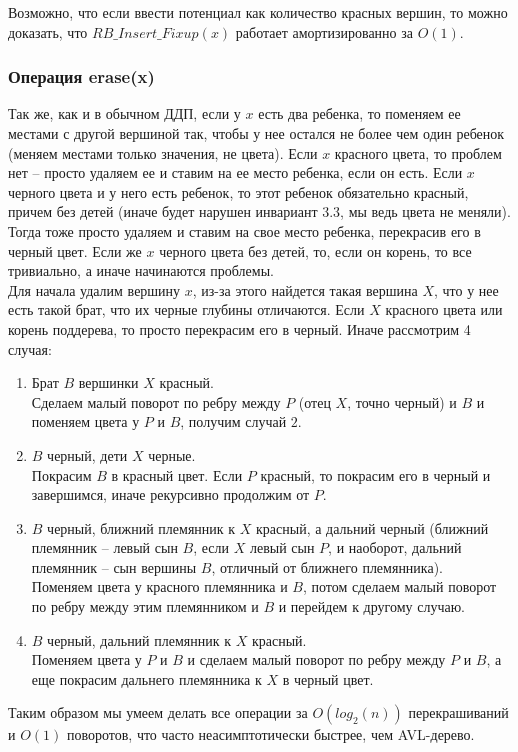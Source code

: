 \begin{note}
    Возможно, что если ввести потенциал как количество красных вершин, то можно доказать, что $RB\_Insert\_Fixup(x)$ работает амортизированно за $O(1)$.
\end{note}

\subsubsection{Операция erase(x)}

Так же, как и в обычном ДДП, если у $x$ есть два ребенка, то поменяем ее местами с другой вершиной так, чтобы у нее остался не более чем один ребенок (меняем местами только значения, не цвета). Если $x$ красного цвета, то проблем нет -- просто удаляем ее и ставим на ее место ребенка, если он есть. Если $x$ черного цвета и у него есть ребенок, то этот ребенок обязательно красный, причем без детей (иначе будет нарушен инвариант $3.3$, мы ведь цвета не меняли). Тогда тоже просто удаляем и ставим на свое место ребенка, перекрасив его в черный цвет. Если же $x$ черного цвета без детей, то, если он корень, то все тривиально, а иначе начинаются проблемы. \\
Для начала удалим вершину $x$, из-за этого найдется такая вершина $X$, что у нее есть такой брат, что их черные глубины отличаются. Если $X$ красного цвета или корень поддерева, то просто перекрасим его в черный. Иначе рассмотрим 4 случая:

\begin{enumerate}
    \item Брат $B$ вершинки $X$ красный. \\
    Сделаем малый поворот по ребру между $P$ (отец $X$, точно черный) и $B$ и поменяем цвета у $P$ и $B$, получим случай $2$.
    \item $B$ черный, дети $X$ черные. \\
    Покрасим $B$ в красный цвет. Если $P$ красный, то покрасим его в черный и завершимся, иначе рекурсивно продолжим от $P$.
    \item $B$ черный, ближний племянник к $X$ красный, а дальний черный (ближний племянник -- левый сын $B$, если $X$ левый сын $P$, и наоборот, дальний племянник -- сын вершины $B$, отличный от ближнего племянника). \\
    Поменяем цвета у красного племянника и $B$, потом сделаем малый поворот по ребру между этим племянником и $B$ и перейдем к другому случаю.
    \item $B$ черный, дальний племянник к $X$ красный. \\
    Поменяем цвета у $P$ и $B$ и сделаем малый поворот по ребру между $P$ и $B$, а еще покрасим дальнего племянника к $X$ в черный цвет.
\end{enumerate}

Таким образом мы умеем делать все операции за $O(log_2(n))$ перекрашиваний и $O(1)$ поворотов, что часто неасимптотически быстрее, чем AVL-дерево. \pagebreak
